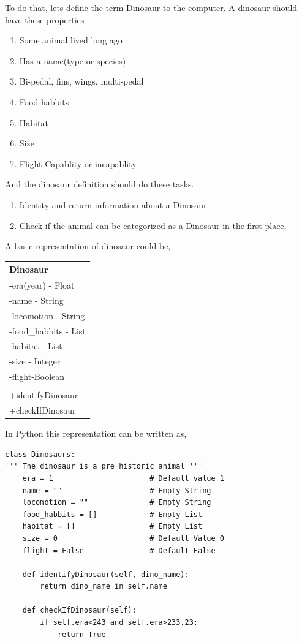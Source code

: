 \documentclass[11pt]{article}
\begin{document}
To do that, lets define the term Dinosaur to the computer. A dinosaur should have these properties

\begin{enumerate}
\item Some animal lived long ago
\item Has a name(type or species)
\item Bi-pedal, fins, wings, multi-pedal
\item Food habbits
\item Habitat
\item Size
\item Flight Capablity or incapablity
\end{enumerate}


And the dinosaur definition should do these tasks.

\begin{enumerate}
\item Identity and return information about a Dinosaur
\item Check if the animal can be categorized as a Dinosaur in the first place.
\end{enumerate}



A basic representation of dinosaur could be,

\begin{center}
\begin{tabular}{|l|}
\hline
Dinosaur \\
\hline
-era(year) - Float \\
-name - String \\
-locomotion - String \\
-food\_habbits - List \\
-habitat - List \\
-size - Integer \\
-flight-Boolean \\
 \\
\hline
+identifyDinosaur \\
+checkIfDinosaur \\
\hline
\end{tabular}
\end{center}


In Python this representation can be written as,
\begin{verbatim}
class Dinosaurs:
''' The dinosaur is a pre historic animal '''
    era = 1                      # Default value 1
    name = ""                    # Empty String
    locomotion = ""              # Empty String
    food_habbits = []            # Empty List
    habitat = []                 # Empty List
    size = 0                     # Default Value 0
    flight = False               # Default False

    def identifyDinosaur(self, dino_name):
        return dino_name in self.name

    def checkIfDinosaur(self):
        if self.era<243 and self.era>233.23:
            return True
\end{verbatim}
\end{document}
